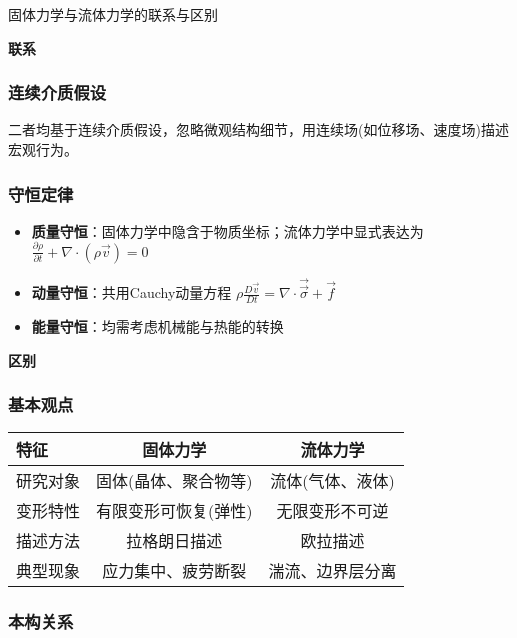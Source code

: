     \begin{example}
        固体力学与流体力学的联系与区别

    \begin{center}
        \textbf{联系}
    \end{center}
    \subsubsection{连续介质假设}
    二者均基于连续介质假设，忽略微观结构细节，用连续场(如位移场、速度场)描述宏观行为。   
    \subsubsection{守恒定律}
    \begin{itemize}
        \item \textbf{质量守恒}：固体力学中隐含于物质坐标；流体力学中显式表达为$\frac{\partial \rho}{\partial t} + \nabla \cdot (\rho \vec{v}) = 0$
        \item \textbf{动量守恒}：共用Cauchy动量方程 $\rho \frac{D\vec{v}}{Dt} = \nabla \cdot \vec{\vec{\sigma}} + \vec{f}$
        \item \textbf{能量守恒}：均需考虑机械能与热能的转换
    \end{itemize}
    \newpage
    \begin{center}
        \textbf{区别}
    \end{center}

    \subsubsection{基本观点}
    \begin{table}[h]
        \centering
        \begin{tabular}{lcc}
            \toprule
            特征 & 固体力学 & 流体力学 \\
            \midrule
            研究对象 & 固体(晶体、聚合物等) & 流体(气体、液体) \\
            变形特性 & 有限变形可恢复(弹性) & 无限变形不可逆 \\
            描述方法 & 拉格朗日描述 & 欧拉描述 \\
            典型现象 & 应力集中、疲劳断裂 & 湍流、边界层分离 \\
            \bottomrule
        \end{tabular}
    \end{table}
    
    \subsubsection{本构关系}

\end{example}
